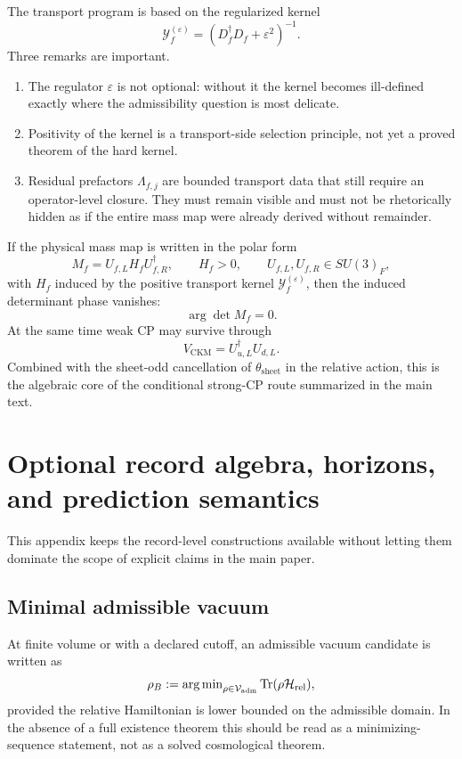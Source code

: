 The transport program is based on the regularized kernel
\[
\mathcal Y_f^{(\varepsilon)}=(D_f^\dagger D_f+\varepsilon^2)^{-1}.
\]
Three remarks are important.
\begin{enumerate}[leftmargin=1.5em, topsep=3pt, itemsep=3pt]
    \item The regulator $\varepsilon$ is not optional: without it the kernel becomes ill-defined exactly where the admissibility question is most delicate.
    \item Positivity of the kernel is a transport-side selection principle, not yet a proved theorem of the hard kernel.
    \item Residual prefactors $\Lambda_{f,j}$ are bounded transport data that still require an operator-level closure. They must remain visible and must not be rhetorically hidden as if the entire mass map were already derived without remainder.
\end{enumerate}

\begin{remark}
If the physical mass map is written in the polar form
\[
M_f=U_{f,L}H_fU_{f,R}^\dagger,
\qquad
H_f>0,
\qquad
U_{f,L},U_{f,R}\in SU(3)_F,
\]
with $H_f$ induced by the positive transport kernel $\mathcal Y_f^{(\varepsilon)}$, then the induced determinant phase vanishes:
\[
\arg\det M_f=0.
\]
At the same time weak CP may survive through
\[
V_{\mathrm{CKM}}=U_{u,L}^\dagger U_{d,L}.
\]
Combined with the sheet-odd cancellation of $\theta_{\mathrm{sheet}}$ in the relative action, this is the algebraic core of the conditional strong-CP route summarized in the main text.
\end{remark}

\section{Optional record algebra, horizons, and prediction semantics}
\label{app:record}

This appendix keeps the record-level constructions available without letting them dominate the scope of explicit claims in the main paper.

\subsection{Minimal admissible vacuum}

At finite volume or with a declared cutoff, an admissible vacuum candidate is written as
\[
\rho_B
:=
\operatorname{arg\,min}_{\rho\in\mathcal V_{\mathrm{adm}}}\operatorname{Tr}(\rho\mathcal H_{\mathrm{rel}}),
\]
provided the relative Hamiltonian is lower bounded on the admissible domain. In the absence of a full existence theorem this should be read as a minimizing-sequence statement, not as a solved cosmological theorem.

